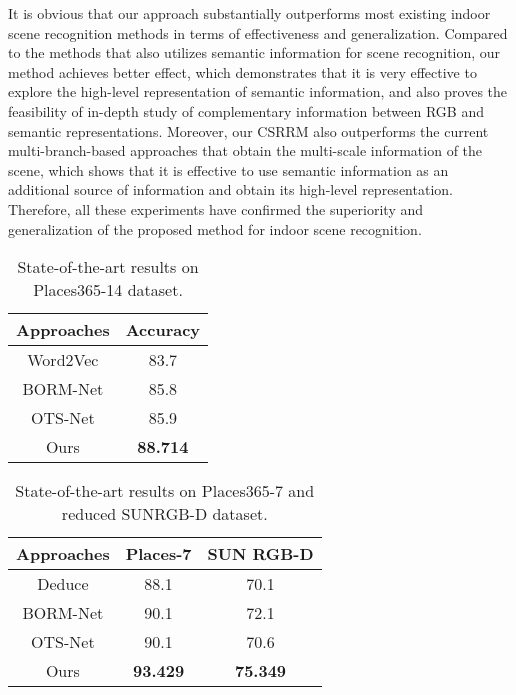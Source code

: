 \documentclass[conference]{IEEEtran}
\begin{document}
It is obvious that our approach substantially outperforms most existing indoor scene recognition methods in terms of effectiveness and generalization. Compared to the methods\cite{ref17,ref20,ref16,ref7,ref19,ref18} that also utilizes semantic information for scene recognition, our method achieves better effect, which demonstrates that it is very effective to explore the high-level representation of semantic information, and also proves the feasibility of in-depth study of complementary information between RGB and semantic representations. Moreover, our CSRRM also outperforms the current multi-branch-based approaches\cite{ref12,ref26,ref27,ref17,ref28,ref24,ref20} that obtain the multi-scale information of the scene,  which shows that it is effective to use semantic information as an additional source of information and obtain its high-level representation. Therefore, all these experiments have confirmed the superiority and generalization of the proposed method for indoor scene recognition.

\begin{table}[htbp]
    \centering
    \caption{State-of-the-art results on Places365-14 dataset.}
    \begin{tabular}{cc}
    \hline
        \textbf{Approaches}  & \textbf{Accuracy}  \\ \hline
        Word2Vec\cite{ref29}   & 83.7  \\ 
        BORM-Net\cite{ref20}   & 85.8  \\ 
        OTS-Net\cite{ref16}   & 85.9  \\ 
        Ours  & \textbf{88.714}  \\ \hline
    \end{tabular}
    \label{tab5}
\end{table}

\begin{table}[htbp]
    \centering
    \caption{State-of-the-art results on Places365-7 and reduced SUNRGB-D dataset.}
    \begin{tabular}{ccc}
    \hline
        \textbf{Approaches}  & \textbf{Places-7}  & \textbf{SUN RGB-D}  \\ \hline
        Deduce\cite{ref18}   & 88.1  & 70.1  \\ 
        BORM-Net\cite{ref20}   & 90.1  & 72.1  \\ 
        OTS-Net\cite{ref16}   & 90.1  & 70.6  \\ 
        Ours  & \textbf{93.429}  & \textbf{75.349 } \\ \hline
    \end{tabular}
    \label{tab6}
\end{table}
\end{document}
